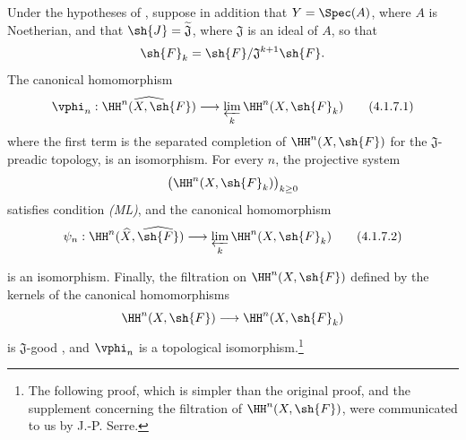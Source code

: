 \begin{corollary}[4.1.7]
\label{III.4.1.7}
Under the hypotheses of , suppose in addition that
$Y=\Spec(A)$, where $A$ is Noetherian, and that
$\sh{J}=\widetilde{\mathfrak{J}}$, where $\mathfrak{J}$ is an ideal
of $A$, so that
\[
  \sh{F}_k=\sh{F}/\mathfrak{J}^{k+1}\sh{F}.
\]
The canonical homomorphism
\[
  \vphi_n:
  \widehat{\HH^n(X,\sh{F})}
  \longrightarrow
  \varprojlim_k\HH^n(X,\sh{F}_k)
  \tag{4.1.7.1}
  \label{III.4.1.7.1}
\]
where the first term is the separated completion of
$\HH^n(X,\sh{F})$ for the $\mathfrak{J}$-preadic topology, is an
isomorphism.
For every $n$, the projective system
\[
  \bigl(\HH^n(X,\sh{F}_k)\bigr)_{k\geq0}
\]
satisfies condition \emph{(ML)}, and the canonical homomorphism
\[
  \psi_n:
  \HH^n(\widehat{X},\widehat{\sh{F}})
  \longrightarrow
  \varprojlim_k\HH^n(X,\sh{F}_k)
  \tag{4.1.7.2}
  \label{III.4.1.7.2}
\]


is an isomorphism.
Finally, the filtration on $\HH^n(X,\sh{F})$ defined by the kernels
of the canonical homomorphisms
\[
  \HH^n(X,\sh{F})\longrightarrow\HH^n(X,\sh{F}_k)
\]
is $\mathfrak{J}$-good , and $\vphi_n$ is a
topological isomorphism.\footnote{The following proof, which is
simpler than the original proof, and the supplement concerning the
filtration of $\HH^n(X,\sh{F})$, were communicated to us by
J.-P. Serre.}
\end{corollary}


